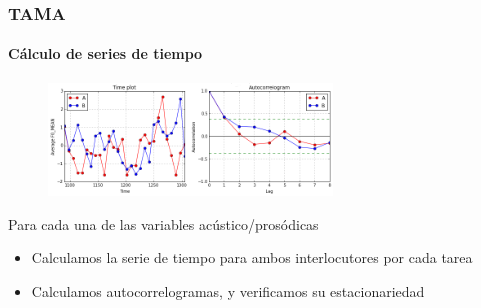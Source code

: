 \begin{frame}
\frametitle{TAMA}
\framesubtitle{Cálculo de series de tiempo}

\begin{figure}
\centering
\includegraphics[height=3cm]{images/time_plot_with_autocorrelation.png}
\end{figure}



Para cada una de las variables acústico/prosódicas

\begin{itemize}
  \item Calculamos la serie de tiempo para ambos interlocutores por cada tarea
  \item Calculamos autocorrelogramas, y verificamos su estacionariedad
\end{itemize}
\end{frame}

